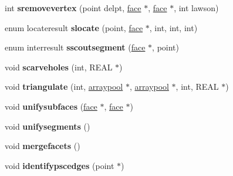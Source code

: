 \begin{DoxyCompactItemize}
\item 
\hypertarget{classtetgenmesh_a7fc2b1bb2e54a5e013edc3e23bd0523b}{int {\bfseries sremovevertex} (point delpt, \hyperlink{classtetgenmesh_1_1face}{face} $\ast$, \hyperlink{classtetgenmesh_1_1face}{face} $\ast$, int lawson)}\label{classtetgenmesh_a7fc2b1bb2e54a5e013edc3e23bd0523b}

\item 
\hypertarget{classtetgenmesh_ac3501a618bd4f4102d0f4722c7de3926}{enum locateresult {\bfseries slocate} (point, \hyperlink{classtetgenmesh_1_1face}{face} $\ast$, int, int, int)}\label{classtetgenmesh_ac3501a618bd4f4102d0f4722c7de3926}

\item 
\hypertarget{classtetgenmesh_a6317b6e8e758e18656ed7080a96fb9b6}{enum interresult {\bfseries sscoutsegment} (\hyperlink{classtetgenmesh_1_1face}{face} $\ast$, point)}\label{classtetgenmesh_a6317b6e8e758e18656ed7080a96fb9b6}

\item 
\hypertarget{classtetgenmesh_a2473a9f86cb5829968a01fdad0d3df7d}{void {\bfseries scarveholes} (int, R\-E\-A\-L $\ast$)}\label{classtetgenmesh_a2473a9f86cb5829968a01fdad0d3df7d}

\item 
\hypertarget{classtetgenmesh_af62b4d5ed09b5a10704caf321e9c5b06}{void {\bfseries triangulate} (int, \hyperlink{classtetgenmesh_1_1arraypool}{arraypool} $\ast$, \hyperlink{classtetgenmesh_1_1arraypool}{arraypool} $\ast$, int, R\-E\-A\-L $\ast$)}\label{classtetgenmesh_af62b4d5ed09b5a10704caf321e9c5b06}

\item 
\hypertarget{classtetgenmesh_afc39c975666d8787e07ad45a9d2e1e67}{void {\bfseries unifysubfaces} (\hyperlink{classtetgenmesh_1_1face}{face} $\ast$, \hyperlink{classtetgenmesh_1_1face}{face} $\ast$)}\label{classtetgenmesh_afc39c975666d8787e07ad45a9d2e1e67}

\item 
\hypertarget{classtetgenmesh_adcb0e0e582808c23829b42708a7596dc}{void {\bfseries unifysegments} ()}\label{classtetgenmesh_adcb0e0e582808c23829b42708a7596dc}

\item 
\hypertarget{classtetgenmesh_a5abff2e7fa8ae0632729d11f61c9f2a8}{void {\bfseries mergefacets} ()}\label{classtetgenmesh_a5abff2e7fa8ae0632729d11f61c9f2a8}

\item 
\hypertarget{classtetgenmesh_a3193fcbef94cca623411966a3661f215}{void {\bfseries identifypscedges} (point $\ast$)}\label{classtetgenmesh_a3193fcbef94cca623411966a3661f215}


\end{DoxyCompactItemize}

